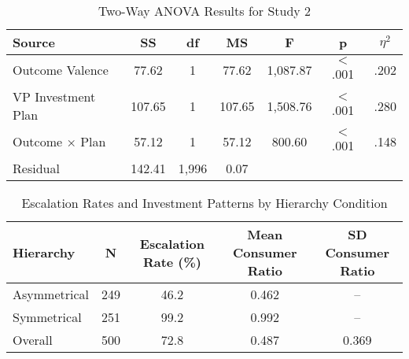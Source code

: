 \documentclass[letterpaper]{article} %
\begin{document}
\begin{table*}[t]
\centering
\caption{Two-Way ANOVA Results for Study 2}
\label{tab:study2_anova}
\begin{tabular}{lcccccc}
\hline
Source & SS & df & MS & F & p & $\eta^2$ \\
\hline
Outcome Valence & 77.62 & 1 & 77.62 & 1,087.87 & $<$.001 & .202 \\
VP Investment Plan & 107.65 & 1 & 107.65 & 1,508.76 & $<$.001 & .280 \\
Outcome × Plan & 57.12 & 1 & 57.12 & 800.60 & $<$.001 & .148 \\
Residual & 142.41 & 1,996 & 0.07 & & & \\
\hline
\end{tabular}
\end{table*}


\begin{table*}[t]
\centering
\caption{Escalation Rates and Investment Patterns by Hierarchy Condition}
\label{tab:study3_descriptives}
\begin{tabular}{lcccc}
\hline
Hierarchy & N & Escalation Rate (\%) & Mean Consumer Ratio & SD Consumer Ratio \\
\hline
Asymmetrical & 249 & 46.2 & 0.462 & -- \\
Symmetrical & 251 & 99.2 & 0.992 & -- \\
Overall & 500 & 72.8 & 0.487 & 0.369 \\
\hline
\end{tabular}
\end{table*}
\end{document}
